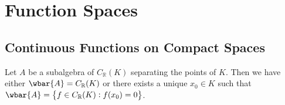 \section{Function Spaces}
\subsection{Continuous Functions on Compact Spaces}

\begin{theorem}
	Let $A$ be a subalgebra of $C_\mathbb{R}(K)$ separating the points of $K$. Then we have either $\wbar{A} = C_\mathbb{R}(K)$ or there exists a unique $x_0 \in K$ such that $\wbar{A} = \cbr{f \in C_\mathbb{R}(K) : f(x_0) = 0}$.
\end{theorem}
